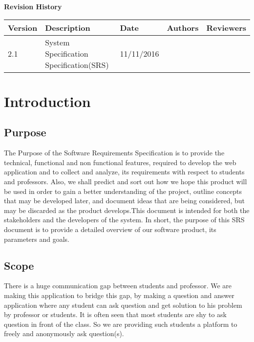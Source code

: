 \documentclass[12pt]{article}
\begin{document}
	\textbf{Revision History}
	\begin{center}
		\begin{tabular}{ | m{3em} | m{8em} | m{5em} | m{4em} | m{4em} | }
			\hline
			Version & Description & Date       & Authors            & Reviewers \\
			\hline
			2.1     & System Specification Specification(SRS)    & 11/11/2016 &  &   \\ 
			\hline
		
		\end{tabular}
	\end{center}
	
	\newpage
	\tableofcontents
	
	\newpage
	
\section{Introduction}

\subsection{Purpose}
The Purpose of the Software Requirements Specification is to provide the technical, functional and non functional features, required to develop the web application and to collect and analyze, its requirements with respect to students and professors. Also, we shall predict and sort out how we hope this product will be used in order to gain a better understanding of the project, outline concepts that may be developed later, and document ideas that are being considered, but may be discarded as the product develops.This document is intended for both the stakeholders and the developers of the system. In short, the
purpose of this SRS document is to provide a detailed overview of our software product, its parameters
and goals.

\subsection{Scope}
There is a huge communication gap between students and professor. We are making this application to bridge this gap, by making a question and answer application where any student can ask question and get solution to his problem by professor or students. It is often seen that most students are shy to ask question in front of the class. So we are providing such students a platform to freely and anonymously ask question(s).
\end{document}
